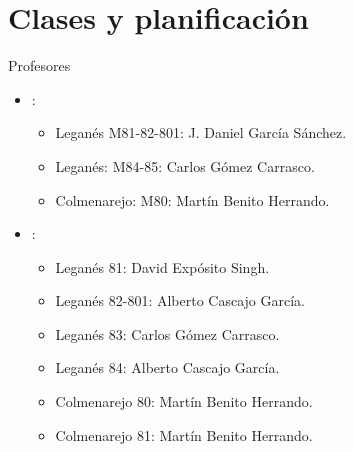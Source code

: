 \section{Clases y planificación}

\begin{frame}[t]{Profesores}
\begin{itemize}
  \item {}: 
    \begin{itemize}
      \item Leganés M81-82-801: J. Daniel García Sánchez.
      \item Leganés: M84-85: Carlos Gómez Carrasco.
      \item Colmenarejo: M80: Martín Benito Herrando.
    \end{itemize}
  \item {}: 
    \begin{itemize}
      \item Leganés 81: David Expósito Singh.
      \item Leganés 82-801: Alberto Cascajo García.
      \item Leganés 83: Carlos Gómez Carrasco.
      \item Leganés 84: Alberto Cascajo García.
      \item Colmenarejo 80: Martín Benito Herrando.
      \item Colmenarejo 81: Martín Benito Herrando.
    \end{itemize}
\end{itemize}
\end{frame}

